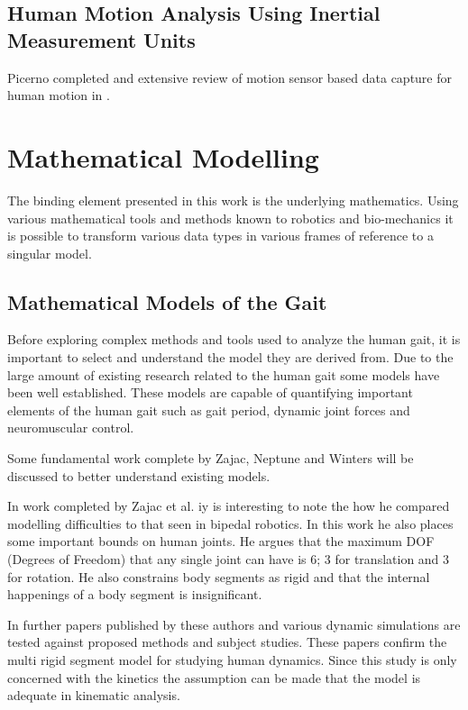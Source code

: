\subsection{Human Motion Analysis Using Inertial Measurement Units}
Picerno completed and extensive review of motion sensor based data capture for human motion in \cite{picerno201725}. 










\section{Mathematical Modelling}
The binding element presented in this work is the underlying mathematics. Using various mathematical tools and methods known to robotics and bio-mechanics it is possible to transform various data types in various frames of reference to a singular model.



\subsection{Mathematical Models of the Gait}
Before exploring complex methods and tools used to analyze the human gait, it is important to select and understand the model they are derived from. Due to the large amount of existing research related to the human gait some models have been well established. These models are capable of quantifying important elements of the human gait such as gait period, dynamic joint forces and neuromuscular control. 

Some fundamental work complete by Zajac, Neptune and Winters will be discussed to better understand existing models.

In work completed by Zajac et al. \cite{zajac1990modeling} iy is interesting to note the how he compared modelling difficulties to that seen in bipedal robotics. In this work he also places some important bounds on human joints. He argues that the maximum DOF (Degrees of Freedom) that any single joint can have is 6; 3 for translation and 3 for rotation. He also constrains body segments as rigid and that the internal happenings of a body segment is insignificant. 
 
In further papers published by these authors \cite{zajac2002biomechanics} and  \cite{zajac2003biomechanics} various dynamic simulations are tested against proposed methods and subject studies. These papers confirm the multi rigid segment model for studying human dynamics. Since this study is only concerned with the kinetics the assumption can be made that the model is adequate in kinematic analysis. 


